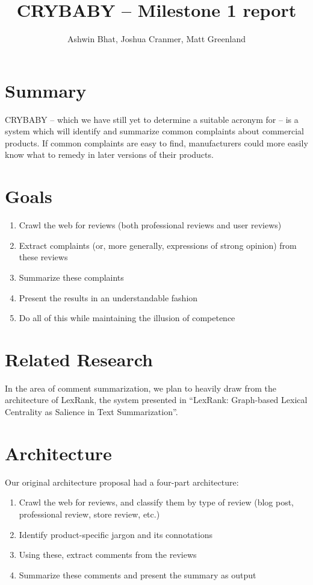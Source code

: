 \documentclass{article}
\title{CRYBABY -- Milestone 1 report}
\author{Ashwin Bhat, Joshua Cranmer, Matt Greenland}
\begin{document}
\maketitle
\tableofcontents
\section{Summary}
CRYBABY -- which we have still yet to determine a suitable acronym for -- is a
system which will identify and summarize common complaints about commercial
products. If common complaints are easy to find, manufacturers could more
easily know what to remedy in later versions of their products.

\section{Goals}
\begin{enumerate}
\item Crawl the web for reviews (both professional reviews and user reviews)
\item Extract complaints (or, more generally, expressions of strong opinion)
from these reviews
\item Summarize these complaints
\item Present the results in an understandable fashion
\item Do all of this while maintaining the illusion of competence
\end{enumerate}

\section{Related Research}
In the area of comment summarization, we plan to heavily draw from the
architecture of LexRank, the system presented in ``LexRank: Graph-based
Lexical Centrality as Salience in Text Summarization''.

\section{Architecture}
Our original architecture proposal had a four-part architecture:
\begin{enumerate}
\item Crawl the web for reviews, and classify them by type of review
(blog post, professional review, store review, etc.)
\item Identify product-specific jargon and its connotations
\item Using these, extract comments from the reviews
\item Summarize these comments and present the summary as output
\end{enumerate}
\end{document}
